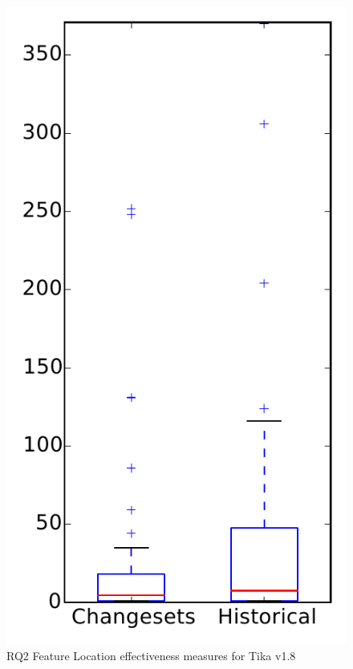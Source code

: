 
\begin{figure}
\centering
\includegraphics[height=0.4\textheight]{figures/flt/rq2_tika}
\caption{RQ2 Feature Location effectiveness measures for Tika v1.8}
\label{fig:flt:rq2:tika}
\end{figure}
